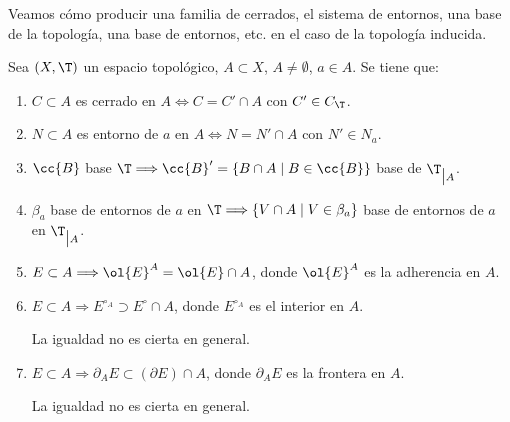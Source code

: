 Veamos cómo producir una familia de cerrados, el sistema de entornos, una base de la topología, una base de entornos, etc. en el caso de la topología inducida.
\begin{prop} \label{prop:PropiedadesInducida}
Sea $(X,\T)$ un espacio topológico, $A\subset X$, $A\neq \emptyset$, $a\in A$. Se tiene que:
\begin{enumerate}
    \item $C\subset A$ es cerrado en $A \Longleftrightarrow C=C'\cap A$ con $C'\in C_\T$.
    \item $N\subset A$ es entorno de $a$ en $A \Longleftrightarrow N=N'\cap A$ con $N'\in N_a$.
    \item $\cc{B}$ base $\T \Longrightarrow \cc{B}'=\{B\cap A\mid B\in \cc{B}\}$ base de $\T_{\big| A}$.
    \item $\beta_a$ base de entornos de $a$ en $\T \Longrightarrow \{V\cap A\mid V\in \beta_a\}$ base de entornos de $a$ en $\T_{\big| A}$.
    \item $E\subset A\Longrightarrow \ol{E}^A = \ol{E}\cap A$, donde $\ol{E}^A$ es la adherencia en $A$.
    \item $E\subset A\Longrightarrow E^{\circ_A} \supset E^\circ \cap A$, donde ${E}^{\circ_A}$ es el interior en $A$.

    La igualdad no es cierta en general.
    \item $E\subset A\Longrightarrow \partial_AE \subset (\partial E)\cap A$, donde $\partial_AE$ es la frontera en $A$.

    La igualdad no es cierta en general.
\end{enumerate}
\end{prop}
